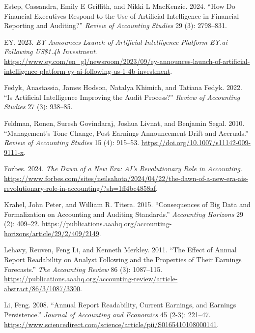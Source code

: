 \documentclass[
  letterpaper,
  DIV=11,
  numbers=noendperiod]{scrreprt}
\newlength{\cslhangindent}
\newenvironment{CSLReferences}[2] %
 {\begin{list}{}{%
  \setlength{\itemindent}{0pt}
  \setlength{\leftmargin}{0pt}
  \setlength{\parsep}{0pt}
  \ifodd #1
   \setlength{\leftmargin}{\cslhangindent}
   \setlength{\itemindent}{-1\cslhangindent}
  \fi
  \setlength{\itemsep}{#2\baselineskip}}}
 {\end{list}}
\begin{document}
\begin{CSLReferences}{1}{1}
Estep, Cassandra, Emily E Griffith, and Nikki L MacKenzie. 2024. {``How
Do Financial Executives Respond to the Use of Artificial Intelligence in
Financial Reporting and Auditing?''} \emph{Review of Accounting Studies}
29 (3): 2798--831.

EY. 2023. \emph{EY Announces Launch of Artificial Intelligence Platform
EY.ai Following US\$1.4b Investment}.
\url{https://www.ey.com/en_gl/newsroom/2023/09/ey-announces-launch-of-artificial-intelligence-platform-ey-ai-following-us-1-4b-investment}.

Fedyk, Anastassia, James Hodson, Natalya Khimich, and Tatiana Fedyk.
2022. {``Is Artificial Intelligence Improving the Audit Process?''}
\emph{Review of Accounting Studies} 27 (3): 938--85.

Feldman, Ronen, Suresh Govindaraj, Joshua Livnat, and Benjamin Segal.
2010. {``Management's Tone Change, Post Earnings Announcement Drift and
Accruals.''} \emph{Review of Accounting Studies} 15 (4): 915--53.
\url{https://doi.org/10.1007/s11142-009-9111-x}.

Forbes. 2024. \emph{The Dawn of a New Era: AI's Revolutionary Role in
Accounting}.
\url{https://www.forbes.com/sites/neilsahota/2024/04/22/the-dawn-of-a-new-era-ais-revolutionary-role-in-accounting/?sh=1ff4bc4858af}.

Krahel, John Peter, and William R. Titera. 2015. {``Consequences of Big
Data and Formalization on Accounting and Auditing Standards.''}
\emph{Accounting Horizons} 29 (2): 409--22.
\url{https://publications.aaahq.org/accounting-horizons/article/29/2/409/2149}.

Lehavy, Reuven, Feng Li, and Kenneth Merkley. 2011. {``The Effect of
Annual Report Readability on Analyst Following and the Properties of
Their Earnings Forecasts.''} \emph{The Accounting Review} 86 (3):
1087--115.
\url{https://publications.aaahq.org/accounting-review/article-abstract/86/3/1087/3300}.

Li, Feng. 2008. {``Annual Report Readability, Current Earnings, and
Earnings Persistence.''} \emph{Journal of Accounting and Economics} 45
(2-3): 221--47.
\url{https://www.sciencedirect.com/science/article/pii/S0165410108000141}.


\end{CSLReferences}
\end{document}
